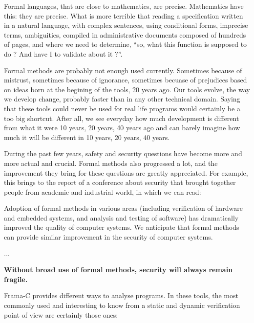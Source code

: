 \documentclass[middle]{zmdocument}
\begin{document}
Formal languages, that are close to mathematics, are precise.
Mathematics have this: they are precise. What is more terrible that
reading a specification written in a natural language, with complex
sentences, using conditional forms, imprecise terms, ambiguities,
compiled in administrative documents composed of hundreds of pages, and
where we need to determine, ``so, what this function is supposed to do ?
And have I to validate about it ?''.

Formal methods are probably not enough used currently. Sometimes because
of mistrust, sometimes because of ignorance, sometimes becuase of
prejudices based on ideas born at the begining of the tools, 20 years
ago. Our tools evolve, the way we develop change, probably faster than
in any other technical domain. Saying that these tools could never be
used for real life programs would certainly be a too big shortcut. After
all, we see everyday how much development is different from what it were
10 years, 20 years, 40 years ago and can barely imagine how much it will
be different in 10 years, 20 years, 40 years.

During the past few years, safety and security questions have become
more and more actual and crucial. Formal methods also progressed a lot,
and the improvement they bring for these questions are greatly
appreciated. For example, this
 brings to the
report of a conference about security that brought together people from
academic and industrial world, in which we can read:



\begin{Quotation}
Adoption of formal methods in various areas (including verification of hardware
and embedded systems, and analysis and testing of software) has dramatically 
improved the quality of computer systems.  We anticipate that formal methods 
can provide similar improvement in the security of computer systems.

...

\textbf{Without broad use of formal methods, security will always remain fragile.}
\end{Quotation}







Frama-C provides different ways to analyse programs. In these tools, the
most commonly used and interesting to know from a static and dynamic
verification point of view are certainly those ones:
\end{document}
